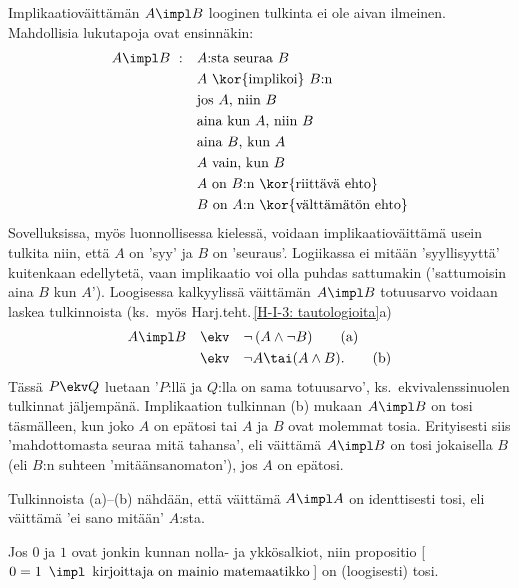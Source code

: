 Implikaatioväittämän $A \impl B$ looginen tulkinta ei ole aivan ilmeinen. Mahdollisia lukutapoja
ovat ensinnäkin:  %
\begin{align*}
A \impl B\ : \quad &\text{$A$:sta seuraa $B$}                 \\
                   &\text{$A$ \kor{implikoi} $B$:n}           \\
                   &\text{jos $A$, niin $B$}                  \\
                   &\text{aina kun $A$, niin $B$}             \\
                   &\text{aina $B$, kun $A$}                  \\
                   &\text{$A$ vain, kun $B$}                  \\
                   &\text{$A$ on $B$:n \kor{riittävä ehto}}   \\
                   &\text{$B$ on $A$:n \kor{välttämätön ehto}}
\end{align*}
Sovelluksissa, myös luonnollisessa kielessä, voidaan implikaatioväittämä usein tulkita niin, 
että $A$ on 'syy' ja $B$ on 'seuraus'. Logiikassa ei mitään 'syyllisyyttä' kuitenkaan 
edellytetä, vaan implikaatio voi olla puhdas sattumakin ('sattumoisin aina $B$ kun $A$'). 
Loogisessa kalkyylissä väittämän $A \impl B$ totuusarvo voidaan laskea tulkinnoista
(ks.\ myös Harj.teht.\,\ref{H-I-3: tautologioita}a)
\begin{align}
A \impl B \quad &\ekv \quad \neg\,(A \wedge \neg B)    \tag{a} \\
                &\ekv \quad \neg A \tai (A \wedge B).  \tag{b}
\end{align}
Tässä $P \ekv Q$ luetaan '$P$:llä ja $Q$:lla on sama totuusarvo', ks.\ ekvivalenssinuolen 
tulkinnat jäljempänä. Implikaation tulkinnan (b) mukaan $A \impl B$ on tosi täsmälleen, kun 
joko $A$ on epätosi tai $A$ ja $B$ ovat molemmat tosia. Erityisesti siis 'mahdottomasta seuraa 
mitä tahansa', eli väittämä $A \impl B$ on tosi jokaisella $B$ (eli $B$:n suhteen 
'mitäänsanomaton'), jos $A$ on epätosi. 
\begin{Exa} Tulkinnoista (a)--(b) nähdään, että väittämä $A \impl A$ on identtisesti tosi, eli
väittämä 'ei sano mitään' $A$:sta.
\loppu \end{Exa}
\begin{Exa} Jos $0$ ja $1$ ovat jonkin kunnan nolla- ja ykkösalkiot, niin propositio
[\,$0 = 1\,\ \impl\,\ \text{kirjoittaja on mainio matemaatikko}$\,] on (loogisesti) tosi. \loppu 
\end{Exa}
